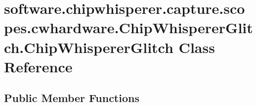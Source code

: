 \hypertarget{classsoftware_1_1chipwhisperer_1_1capture_1_1scopes_1_1cwhardware_1_1ChipWhispererGlitch_1_1ChipWhispererGlitch}{}\section{software.\+chipwhisperer.\+capture.\+scopes.\+cwhardware.\+Chip\+Whisperer\+Glitch.\+Chip\+Whisperer\+Glitch Class Reference}
\label{classsoftware_1_1chipwhisperer_1_1capture_1_1scopes_1_1cwhardware_1_1ChipWhispererGlitch_1_1ChipWhispererGlitch}
\subsection*{Public Member Functions}
